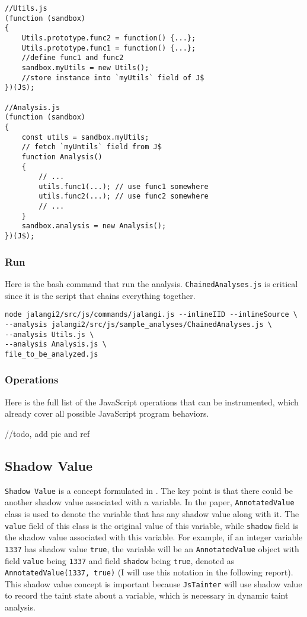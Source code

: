 \begin{verbatim}
//Utils.js
(function (sandbox)
{
    Utils.prototype.func2 = function() {...};
    Utils.prototype.func1 = function() {...};
    //define func1 and func2
    sandbox.myUtils = new Utils();
    //store instance into `myUtils` field of J$
})(J$);

//Analysis.js
(function (sandbox)
{
    const utils = sandbox.myUtils;
    // fetch `myUntils` field from J$
    function Analysis()
    {
        // ...
        utils.func1(...); // use func1 somewhere
        utils.func2(...); // use func2 somewhere
        // ...
    }
    sandbox.analysis = new Analysis();
})(J$);
\end{verbatim}


\subsubsection{Run}

Here is the bash command that run the analysis. \texttt{ChainedAnalyses.js} is critical since it is the script that chains everything together.

\begin{verbatim}
node jalangi2/src/js/commands/jalangi.js --inlineIID --inlineSource \
--analysis jalangi2/src/js/sample_analyses/ChainedAnalyses.js \
--analysis Utils.js \
--analysis Analysis.js \
file_to_be_analyzed.js
\end{verbatim}


\subsubsection{Operations}

Here is the full list of the JavaScript operations that can be instrumented, which already cover all possible JavaScript program behaviors.

//todo, add pic and ref

\subsection{Shadow Value\citep{shadowvalue}}

\texttt{Shadow Value} is a concept formulated in \citep{jalangipaper}. The key point is that there could be another shadow value associated with a variable. In the paper, \texttt{AnnotatedValue} class is used to denote the variable that has any shadow value along with it. The \texttt{value} field of this class is the original value of this variable, while \texttt{shadow} field is the shadow value associated with this variable. For example, if an integer variable \texttt{1337} has shadow value \texttt{true}, the variable will be an \texttt{AnnotatedValue} object with field \texttt{value} being \texttt{1337} and field \texttt{shadow} being \texttt{true}, denoted as \texttt{AnnotatedValue(1337, true)} (I will use this notation in the following report). This shadow value concept is important because \texttt{JsTainter} will use shadow value to record the taint state about a variable, which is necessary in dynamic taint analysis.

